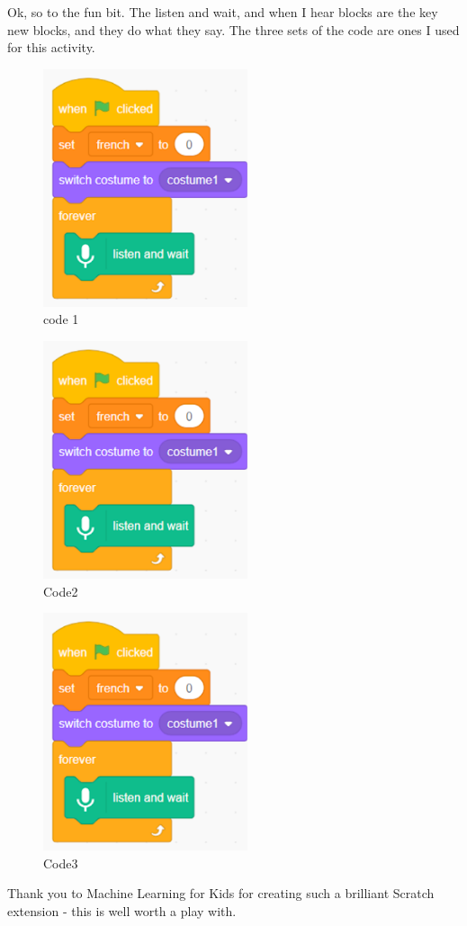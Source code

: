 Ok, so to the fun bit. The listen and wait, and when I hear blocks are the key new blocks, and they do what they say. The three sets of the code are ones I used for this activity.

\begin{figure}
    \centering
    \includegraphics[width=6cm]{chapters/chapterCT1/figures/translate4.png}
    \caption{code 1}
    \label{fig:code1}
\end{figure}
\begin{figure}
    \centering
    \includegraphics[width=6cm]{chapters/chapterCT1/figures/translate5.png}
    \caption{Code2}
    \label{fig:code2}
\end{figure}
\begin{figure}
    \centering
    \includegraphics[width=6cm]{chapters/chapterCT1/figures/translate6.png}
    \caption{Code3}
    \label{fig:code3}
\end{figure}



Thank you to Machine Learning for Kids for creating such a brilliant Scratch extension - this is well worth a play with.

